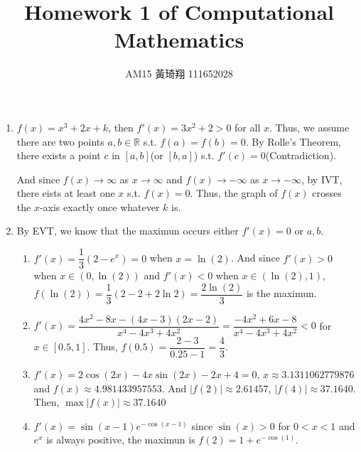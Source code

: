 \documentclass[12pt]{article}
\title{Homework 1 of Computational Mathematics}
\author{AM15 黃琦翔 111652028}
\begin{document}
\maketitle
\begin{enumerate}
    \item $f(x) = x^3 + 2x + k$, then $f'(x) = 3x^2 + 2 > 0$ for all $x$.
    Thus, we assume there are two points $a, b \in \mathbb{R}$ s.t. $f(a) = f(b) = 0$.
    By Rolle's Theorem, there exists a point $c$ in $[a, b]$(or $[b, a]$) s.t. $f'(c) = 0$(Contradiction).

    And since $f(x) \to \infty$ as $x \to \infty$ and $f(x) \to -\infty$ as $x\to -\infty$,
    by IVT, there eists at least one $x$ s.t. $f(x) = 0$.
    Thus, the graph of $f(x)$ crosses the $x$-axis exactly once whatever $k$ is.

    \item By EVT, we know that the maximun occurs either $f'(x) = 0$ or $a, b$.\begin{enumerate}
        \item $f'(x) = \dfrac{1}{3}(2 - e^{x}) = 0$ when $x = \ln(2)$.
        And since $f'(x) > 0$ when $x \in (0, \ln(2))$ and $f'(x) < 0$ when $x\in (\ln(2), 1)$,
        $f(\ln(2)) = \dfrac{1}{3}(2-2+2\ln2) = \dfrac{2\ln(2)}{3}$ is the maximun.

        \item $f'(x) = \dfrac{4x^2 - 8x - (4x-3)(2x-2)}{x^4 - 4x^3 + 4x^2} = \dfrac{-4x^2 + 6x - 8}{x^4 - 4x^3 + 4x^2} < 0$ for $x \in [0.5, 1]$.
        Thus, $f(0.5) = \dfrac{2-3}{0.25-1} = \dfrac{4}{3}$.

        \item $f'(x) = 2\cos(2x) - 4x\sin(2x) - 2x + 4 = 0$, $x \approx 3.1311062779876$ and $f(x) \approx 4.981433957553$.
        And $|f(2)| \approx 2.61457$, $|f(4)| \approx 37.1640$.
        Then, $\max |f(x)| \approx 37.1640$

        \item $f'(x) = \sin(x-1)e^{-\cos(x-1)}$ since $\sin(x) > 0$ for $0 < x < 1$ and $e^{x}$ is always positive, 
        the maximun is $f(2) = 1 + e^{-\cos(1)}$.
    \end{enumerate}


\end{enumerate}
\end{document}
